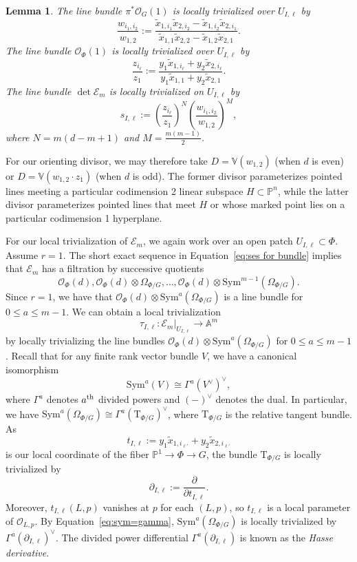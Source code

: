\documentclass[12pt]{amsart}
\numberwithin{equation}{section}
\theoremstyle{plain}
\newtheorem{lem}[thm]{Lemma}
\theoremstyle{definition}
\newcommand{\mb}[1]{\mathbb{#1}}
\newcommand{\mc}[1]{\mathcal{#1}}
\newcommand{\Sym}{\mathrm{Sym}}
\newcommand{\T}{\mathrm{T}}
\begin{document}
\begin{lem}\label{lem:local trivs for 3 bundles}
    The line bundle $\pi^*\mc{O}_G(1)$ is locally trivialized over $U_{I,\ell}$ by
    \[\frac{w_{i_1,i_2}}{w_{1,2}}:=
    \frac{{\tilde x_{1,i_1}\tilde x_{2,i_2}-\tilde x_{1,i_2}\tilde x_{2,i_1}}}{{\tilde x_{1,1}\tilde x_{2,2}-\tilde x_{1,2}\tilde x_{2,1}}}.\] 
    The line bundle $\mc{O}_\Phi(1)$ is locally trivialized over $U_{I,\ell}$ by
    \[\frac{z_{i_\ell}}{z_{1}}:=
    \frac{y_{1}\tilde x_{1,i_\ell}+y_{2}\tilde x_{2,i_\ell}}{y_{1}\tilde x_{1,1}+y_{2}\tilde x_{2,1}}.\]
    The line bundle $\det\mc{E}_m$ is locally trivialized on $U_{I,\ell}$ by
    \[s_{I,\ell}:=\left(\frac{z_{i_\ell}}{z_{1}}\right)^N
    \left(\frac{w_{i_1,i_2}}{w_{1,2}}\right)^M,\]
    where $N=m(d-m+1)$ and $M=\frac{m(m-1)}{2}$.
\end{lem}

For our orienting divisor, we may therefore take $D=\mb{V}(w_{1,2})$ (when $d$ is even) or $D=\mb{V}(w_{1,2}\cdot z_1)$ (when $d$ is odd). The former divisor parameterizes pointed lines meeting a particular codimension 2 linear subspace $H\subset\mb{P}^n$, while the latter divisor parameterizes pointed lines that meet $H$ or whose marked point lies on a particular codimension 1 hyperplane.

For our local trivialization of $\mc{E}_m$, we again work over an open patch $U_{I,\ell}\subset\Phi$. Assume $r=1$. The short exact sequence in Equation~\ref{eq:ses for bundle} implies that $\mc{E}_m$ has a filtration by successive quotients
\begin{equation}\label{eq:filtration}
\mc{O}_\Phi(d),\mc{O}_\Phi(d)\otimes\Omega_{\Phi/G},\ldots,\mc{O}_\Phi(d)\otimes\Sym^{m-1}(\Omega_{\Phi/G}).
\end{equation}
Since $r=1$, we have that $\mc{O}_\Phi(d)\otimes\Sym^a(\Omega_{\Phi/G})$ is a line bundle for $0\leq a\leq m-1$. We can obtain a local trivialization
\[\tau_{I,\ell}\colon \mc{E}_m|_{U_{I,\ell}}\longrightarrow\mb{A}^m\]
by locally trivializing the line bundles $\mc{O}_\Phi(d)\otimes\Sym^a(\Omega_{\Phi/G})$ for $0\leq a\leq m-1$. Recall that for any finite rank vector bundle $V$, we have a canonical isomorphism
\begin{equation}\label{eq:sym=gamma}
\Sym^a(V)\cong\Gamma^a(V^\vee)^\vee,
\end{equation}
where $\Gamma^a$ denotes $a\textsuperscript{th}$ divided powers and $(-)^\vee$ denotes the dual. In particular, we have $\Sym^a(\Omega_{\Phi/G})\cong\Gamma^a(\T_{\Phi/G})^\vee$, where $\T_{\Phi/G}$ is the relative tangent bundle. As 
\[t_{I,\ell}:=y_1\tilde{x}_{1,i_{\ell'}}+y_2\tilde{x}_{2,i_{\ell'}}\]
is our local coordinate of the fiber $\mb{P}^1\to\Phi\to G$, the bundle $\T_{\Phi/G}$ is locally trivialized by
\[\partial_{I,\ell}:=\frac{\partial}{\partial t_{I,\ell}}.\]
Moreover, $t_{I,\ell}(L,p)$ vanishes at $p$ for each $(L,p)$, so $t_{I,\ell}$ is a local parameter of $\mc{O}_{L,p}$. By Equation~\ref{eq:sym=gamma}, $\Sym^a(\Omega_{\Phi/G})$ is locally trivialized by $\Gamma^a(\partial_{I,\ell})^\vee$. The divided power differential $\Gamma^a(\partial_{I,\ell})$ is known as the \emph{Hasse derivative}.
\end{document}
